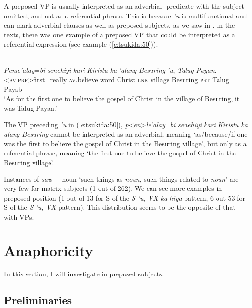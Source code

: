 \documentclass[output=paper
,modfonts
,nonflat]{langsci/langscibook}
\begin{document}
A preposed VP is usually interpreted as an adverbial- predicate with the subject omitted, and not as a referential phrase. This is because \textit{'u} is multifunctional and can mark adverbial clauses as well as preposed subjects, as we saw in . In the texts, there was one example of a preposed VP that could be interpreted as a referential expression (see example (\ref{e:tsukida:50})). 

\begin{exe}
	\label{e:tsukida:50}\\
	\gll \textit{P}{\USSmaller}\textit{en}{\USGreater}\textit{le'alay}=\textit{bi}   \textit{senehiyi}   \textit{kari}   \textit{Kiristu}  \textit{ka}  \textit{'alang}  \textit{Besuring}  \textit{'u},  \textit{Talug}   \textit{Payan}.\\
	<\textsc{av.prf}>first=really \textsc{av}.believe   word   Christ \textsc{lnk} village Besuring \textsc{prt} Talug Payab\\
	\glt ‘As for the first one to believe the gospel of Christ in the village of Besuring, it was Talug Payan.’
\end{exe}

\noindent
The VP preceding \textit{'u} in (\ref{e:tsukida:50}), \textit{p}<\textit{en}>\textit{le'alay}=\textit{bi} \textit{senehiyi kari Kiristu ka alang Besuring} cannot be interpreted as an adverbial, meaning ‘as/because/if one was the first to believe the gospel of Christ in the Besuring village’, but only as a referential phrase, meaning ‘the first one to believe the gospel of Christ in the Besuring village’. 

Instances of \textit{saw} + noun ‘such things as \textit{noun}, such things related to \textit{noun}’ are very few for matrix subjects (1 out of 262). We can see more examples in preposed position (1 out of 13 for S of the \textit{S 'u, VX ka hiya} pattern, 6 out 53 for S of the \textit{S 'u, VX} pattern). This distribution seems to be the opposite of that with VPs.

\section{\label{s:tsukida:4}Anaphoricity}

In this section, I will investigate  in preposed subjects. 

\subsection{\label{s:tsukida:4.1}Preliminaries}
\end{document}
